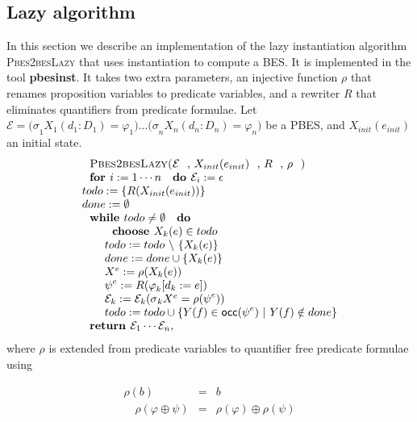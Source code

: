 \subsection{Lazy algorithm}

In this section we describe an implementation of the lazy instantiation
algorithm \textsc{Pbes2besLazy} that uses instantiation to compute a BES. It
is implemented in the tool \textbf{pbesinst}. It takes two extra parameters,
an injective function $\rho $ that renames proposition variables to
predicate variables, and a rewriter $R$ that eliminates quantifiers from
predicate formulae. Let $\mathcal{E=(\sigma }_{1}X_{1}(d_{1}:D_{1})=\varphi
_{1})\ldots \mathcal{(\sigma }_{n}X_{n}(d_{n}:D_{n})=\varphi _{n})$ be a
PBES, and $X_{init}(e_{init})$ an initial state.%
\begin{equation*}
\begin{array}{l}
\text{\textsc{Pbes2besLazy(}}\mathcal{E}\text{, }X_{init}(e_{init})\text{, }R%
\text{, }\rho \text{\textsc{)}} \\ 
\text{\textbf{for }}i:=1\cdots n\text{ \textbf{do }}\mathcal{E}_{i}:=\epsilon
\\ 
todo:=\{R(X_{init}(e_{init}))\} \\ 
done:=\emptyset \\ 
\text{\textbf{while }}todo\neq \emptyset \text{ \textbf{do}} \\ 
\qquad \text{\textbf{choose }}X_{k}(e)\in todo \\ 
\qquad todo:=todo\ \backslash \ \{X_{k}(e)\} \\ 
\qquad done:=done\cup \{X_{k}(e)\} \\ 
\qquad X^{e}:=\rho (X_{k}(e)) \\ 
\qquad \psi ^{e}:=R(\varphi _{k}[d_{k}:=e]) \\ 
\qquad \mathcal{E}_{k}:=\mathcal{E}_{k}(\mathcal{\sigma }_{k}X^{e}=\rho
(\psi ^{e})) \\ 
\qquad todo:=todo\cup \{Y(f)\in \mathsf{occ}(\psi ^{e})\ |\ Y(f)\notin done\}
\\ 
\text{\textbf{return }}\mathcal{E}_{1}\cdots \mathcal{E}_{n},%
\end{array}%
\end{equation*}%
where $\rho $ is extended from predicate variables to quantifier free
predicate formulae using

\begin{eqnarray*}
\rho (b) &=&b \\
\quad \rho (\varphi \oplus \psi ) &=&\rho (\varphi )\oplus \rho (\psi )
\end{eqnarray*}%
\newpage

